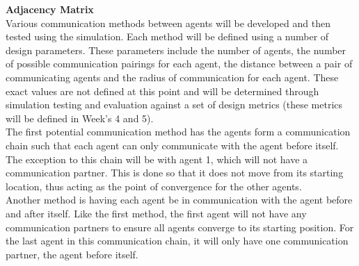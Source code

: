 \documentclass[../CourseManual.tex]{subfiles}
\begin{document}

\textbf{Adjacency Matrix}\\

Various communication methods between agents will be developed and then tested using the simulation. Each method will be defined using a number of design parameters. These parameters include the number of agents, the number of possible communication pairings for each agent, the distance between a pair of communicating agents and the radius of communication for each agent. These exact values are not defined at this point and will be determined through simulation testing and evaluation against a set of design metrics (these metrics will be defined in Week's 4 and 5).\\

The first potential communication method has the agents form a communication chain such that each agent can only communicate with the agent before itself. The exception to this chain will be with agent 1, which will not have a communication partner. This is done so that it does not move from its starting location, thus acting as the point of convergence for the other agents.\\

Another method is having each agent be in communication with the agent before and after itself. Like the first method, the first agent will not have any communication partners to ensure all agents converge to its starting position. For the last agent in this communication chain, it will only have one communication partner, the agent before itself.\\
\end{document}
